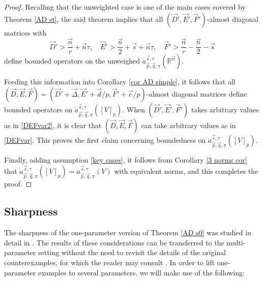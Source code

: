 \documentclass[11pt, reqno]{amsart}
\theoremstyle{definition}
\theoremstyle{remark}
\numberwithin{equation}{section}
\newcommand{\vD}{\vec D}
\newcommand{\vE}{\vec E}
\newcommand{\vF}{\vec F}
\newcommand{\R}{\mathbb R}
\newcommand{\vn}{\vec n}
\newcommand{\vp}{\vec p}
\newcommand{\vq}{\vec q}
\newcommand{\vs}{\vec s}
\newcommand{\atau}{\dot a^{\vs,\tau}_{\vp,\vq,\pi}}
\begin{document}
\begin{proof}
Recalling that the unweighted case is one of the main cases covered by Theorem \ref{AD st}, the said theorem implies that all $(\vD',\vE',\vF')$-almost diagonal matrices with
\begin{equation}\label{DEFvar2}
  \vD'>\frac{\vn}{r}+\vn\tau,\quad
\vE'>\frac{\vn}{2}+\vs+\vn\tau,\quad
\vF'>\frac{\vn}{r}-\frac{\vn}{2}-\vs
\end{equation}
define bounded operators on the unweighed $\atau(\R^{\vn})$.

Feeding this information into Corollary \ref{cor AD simple}, it follows that all $(\vD,\vE,\vF)=(\vD'+ \vec\Delta,\vE'+ {\vec d}/{p},\vF'+ {\vec e}/{p})$-almost diagonal matrices define bounded operators on $\atau([V]_p)$. When $(\vD',\vE',\vF')$ takes arbitrary values as in \eqref{DEFvar2}, it is clear that $(\vD,\vE,\vF)$ can take arbitrary values as in \eqref{DEFvar}. This proves the first claim concerning boundedness on $\atau([V]_p)$.

Finally, adding assumption \eqref{key cases}, it follows from Corollary \ref{3 norms cor} that $\atau([V]_p)=\atau(V)$ with equivalent norms, and this completes the proof.
\end{proof}

\subsection{Sharpness}\label{sharpness}

The sharpness of the one-parameter version of Theorem \ref{AD s0} was studied in detail in \cite{BHYY:1b}. The results of these considerations can be transferred to the multi-parameter setting without the need to revisit the details of the original counterexamples, for which the reader may consult \cite{BHYY:1b}. In order to lift one-parameter examples to several parameters, we will make use of the following:
\end{document}
